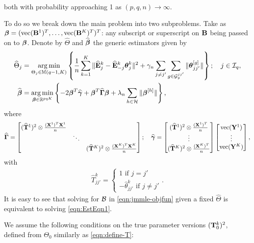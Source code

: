 \vspace{1em}
\noindent both with probability approaching 1 as $(p,q,n) \rightarrow \infty$.

To do so we break down the main problem into two subproblems. Take as ${\boldsymbol{\beta}} = (\operatorname*{vec} ({\mathbf{B}}^1)^T, \ldots, \operatorname*{vec}({\mathbf{B}}^K)^T)^T$: any subscript or superscript on ${\mathbf{B}}$ being passed on to ${\boldsymbol{\beta}}$. Denote by $\widehat \Theta$ and $\widehat {{\boldsymbol{\beta}}}$ the generic estimators given by
%
\begin{align}
\widehat \Theta_j &= \operatorname*{arg\,min}_{\Theta_j \in {\mathbb{M}}(q-1, K)} \left\{ \frac{1}{n} \sum_{k=1}^K \| \widehat {{\mathbf{E}}}^k_j - \widehat {{\mathbf{E}}}^k_{-j} {\boldsymbol{\theta}}_j^k \|^2 + \gamma_n \sum_{j \neq j'} \sum_{g \in {\cal{G}}_y^{jj'}} \| {\boldsymbol{\theta}}_{jj'}^{[g]} \| \right\};
\quad j \in {\cal{I}}_q, \label{eqn:EstEqn2}\\
\widehat {{\boldsymbol{\beta}}} &= \operatorname*{arg\,min}_{{\boldsymbol{\beta}} \in {\mathbb{R}}^{pqK}} \left\{-2 {\boldsymbol{\beta}}^T \widehat {{\boldsymbol{\gamma}}} + {\boldsymbol{\beta}}^T \widehat {{\boldsymbol{\Gamma}}} {\boldsymbol{\beta}} + \lambda_n \sum_{h \in {\cal{H}}} \| {\boldsymbol{\beta}}^{[h]}  \| \right\}, \label{eqn:EstEqn1}
\end{align}
%
where
%
$$
\widehat {{\boldsymbol{\Gamma}}} = \begin{bmatrix}
(\widehat {{\mathbf{T}}}^1)^2 \otimes \frac{({\mathbf{X}}^1)^T {\mathbf{X}}^1}{n} & &\\
& \ddots &\\
& & (\widehat {{\mathbf{T}}}^K)^2 \otimes \frac{({\mathbf{X}}^K)^T {\mathbf{X}}^K}{n}
\end{bmatrix}; \quad
\widehat {{\boldsymbol{\gamma}}} = \begin{bmatrix}
(\widehat {{\mathbf{T}}}^1)^2 \otimes \frac{({\mathbf{X}}^1)^T}{n}\\
\vdots\\
(\widehat {{\mathbf{T}}}^K)^2 \otimes \frac{({\mathbf{X}}^K)^T}{n}
\end{bmatrix}
\begin{bmatrix}
\operatorname*{vec} ({\mathbf{Y}}^1)\\
\vdots\\
\operatorname*{vec} ({\mathbf{Y}}^K)
\end{bmatrix},
$$
with 
%
\begin{align}\label{eqn:define-T}
\hat T_{jj'}^k = \begin{cases}
1 \text{ if } j = j'\\
- \hat \theta_{jj'}^k \text{ if } j \neq j'
\end{cases}.
\end{align}
%
It is easy to see that solving for ${\cal{B}}$ in \eqref{eqn:jmmle-objfun} given a fixed $\widehat \Theta$ is equivalent to solving \eqref{eqn:EstEqn1}.

We assume the following conditions on the true parameter versions $({\mathbf{T}}_0^k)^2$, defined from $\Theta_0$ similarly as \eqref{eqn:define-T}:
%

